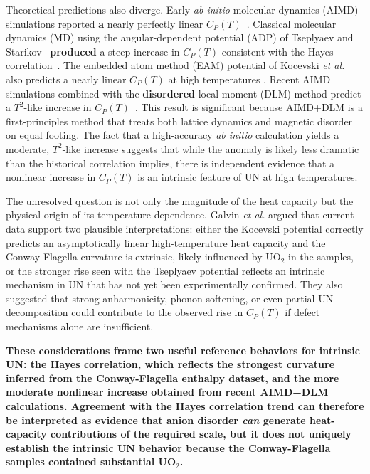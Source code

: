 \documentclass[preprint,12pt,sort&compress]{elsarticle}
\newcommand{\?}{\stackrel{?}{=}}
\providecommand{\DIFaddtex}[1]{{\bf #1}} %
\providecommand{\DIFdeltex}[1]{} %
\providecommand{\DIFaddbegin}{\protect\color{blue}} %
\providecommand{\DIFaddend}{\protect\color{black}} %
\providecommand{\DIFdelbegin}{\protect\color{red}} %
\providecommand{\DIFdelend}{\protect\color{black}} %
\providecommand{\DIFadd}[1]{\texorpdfstring{\DIFaddtex{#1}}{#1}} %
\providecommand{\DIFdel}[1]{\texorpdfstring{\DIFdeltex{#1}}{}} %
\newcommand{\DIFscaledelfig}{0.5}
\newlength{\DIFdelgraphicswidth} %
\newlength{\DIFdelgraphicsheight} %
\newcommand{\DIFaddincludegraphics}[2][]{{\color{blue}\fbox{\DIFOincludegraphics[#1]{#2}}}} %
\newcommand{\DIFdelincludegraphics}[2][]{%
\sbox{\DIFdelgraphicsbox}{\DIFOincludegraphics[#1]{#2}}%
\settoboxwidth{\DIFdelgraphicswidth}{\DIFdelgraphicsbox} %
\settoboxtotalheight{\DIFdelgraphicsheight}{\DIFdelgraphicsbox} %
\scalebox{\DIFscaledelfig}{%
\parbox[b]{\DIFdelgraphicswidth}{\usebox{\DIFdelgraphicsbox}\\[-\baselineskip] \rule{\DIFdelgraphicswidth}{0em}}\llap{\resizebox{\DIFdelgraphicswidth}{\DIFdelgraphicsheight}{%
\setlength{\unitlength}{\DIFdelgraphicswidth}%
\begin{picture}(1,1)%
\thicklines\linethickness{2pt} %
{\color[rgb]{1,0,0}\put(0,0){\framebox(1,1){}}}%
{\color[rgb]{1,0,0}\put(0,0){\line( 1,1){1}}}%
{\color[rgb]{1,0,0}\put(0,1){\line(1,-1){1}}}%
\end{picture}%
}\hspace*{3pt}}} %
} %
\DeclareRobustCommand{\DIFaddbegin}{\DIFOaddbegin \let\includegraphics\DIFaddincludegraphics} %
\DeclareRobustCommand{\DIFaddend}{\DIFOaddend \let\includegraphics\DIFOincludegraphics} %
\DeclareRobustCommand{\DIFdelbegin}{\DIFOdelbegin \let\includegraphics\DIFdelincludegraphics} %
\DeclareRobustCommand{\DIFdelend}{\DIFOaddend \let\includegraphics\DIFOincludegraphics} %
\begin{document}
Theoretical predictions also diverge. Early \textit{ab initio} molecular dynamics (AIMD) simulations reported \DIFdelbegin \DIFdel{an }\DIFdelend \DIFaddbegin \DIFadd{a }\DIFaddend nearly perfectly linear $C_{P}(T)$~\cite{Kocevski2023}. Classical molecular dynamics (MD) using the angular-dependent potential (ADP) of Tseplyaev and Starikov~\cite{Kuksin2016,Tseplyaev2016} \DIFdelbegin \DIFdel{reproduced }\DIFdelend \DIFaddbegin \DIFadd{produced }\DIFaddend a steep increase in $C_P(T)$ consistent with the Hayes correlation~\cite{AbdulHameed2024}. The embedded atom method (EAM) potential of Kocevski \textit{et al.}~\cite{Kocevski2022II} also predicts a nearly linear $C_P(T)$ at high temperatures \cite{AbdulHameed2024}. Recent AIMD simulations combined with the \DIFdelbegin \DIFdel{disorded }\DIFdelend \DIFaddbegin \DIFadd{disordered }\DIFaddend local moment (DLM) method predict a $T^{2}$-like increase in $C_P(T)$~\cite{AbdulHameed2025}. This result is significant because AIMD+DLM is a first-principles method that treats both lattice dynamics and magnetic disorder on equal footing. The fact that a high-accuracy \textit{ab initio} calculation yields a moderate, $T^{2}$-like increase suggests that while the anomaly is likely less dramatic than the historical correlation implies, there is independent evidence that a nonlinear increase in $C_{P}(T)$ is an intrinsic feature of UN at high temperatures.

The unresolved question is not only the magnitude of the heat capacity but the physical origin of its temperature dependence. Galvin \textit{et al.} \cite{Galvin2023} argued that current data support two plausible interpretations: either the Kocevski potential correctly predicts an asymptotically linear high-temperature heat capacity and the Conway-Flagella curvature is extrinsic, likely influenced by UO$_2$ in the samples, or the stronger rise seen with the Tseplyaev potential reflects an intrinsic mechanism in UN that has not yet been experimentally confirmed. They also suggested that strong anharmonicity, phonon softening, or even partial UN decomposition could contribute to the observed rise in $C_P(T)$ if defect mechanisms alone are insufficient.

\DIFaddbegin \DIFadd{These considerations frame two useful reference behaviors for intrinsic UN: the Hayes correlation, which reflects the strongest curvature inferred from the Conway-Flagella enthalpy dataset, and the more moderate nonlinear increase obtained from recent AIMD+DLM calculations. Agreement with the Hayes correlation trend can therefore be interpreted as evidence that anion disorder \emph{can} generate heat-capacity contributions of the required scale, but it does not uniquely establish the intrinsic UN behavior because the Conway-Flagella samples contained substantial UO$_2$.
}
\end{document}
